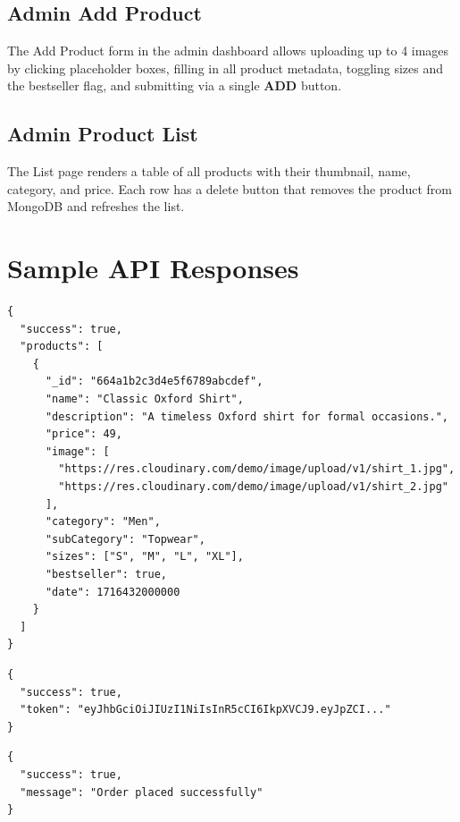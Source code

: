 \documentclass[12pt,a4paper]{report}
\begin{document}
\subsection{Admin Add Product}
The Add Product form in the admin dashboard allows uploading up to 4 images by clicking
placeholder boxes, filling in all product metadata, toggling sizes and the bestseller flag,
and submitting via a single \textbf{ADD} button.

\subsection{Admin Product List}
The List page renders a table of all products with their thumbnail, name, category, and price.
Each row has a delete button that removes the product from MongoDB and refreshes the list.

\section{Sample API Responses}

\begin{lstlisting}[caption={Successful product list response}, label=lst:resp1, language={}]
{
  "success": true,
  "products": [
    {
      "_id": "664a1b2c3d4e5f6789abcdef",
      "name": "Classic Oxford Shirt",
      "description": "A timeless Oxford shirt for formal occasions.",
      "price": 49,
      "image": [
        "https://res.cloudinary.com/demo/image/upload/v1/shirt_1.jpg",
        "https://res.cloudinary.com/demo/image/upload/v1/shirt_2.jpg"
      ],
      "category": "Men",
      "subCategory": "Topwear",
      "sizes": ["S", "M", "L", "XL"],
      "bestseller": true,
      "date": 1716432000000
    }
  ]
}
\end{lstlisting}

\begin{lstlisting}[caption={Successful user login response}, label=lst:resp2, language={}]
{
  "success": true,
  "token": "eyJhbGciOiJIUzI1NiIsInR5cCI6IkpXVCJ9.eyJpZCI..."
}
\end{lstlisting}

\begin{lstlisting}[caption={Successful order placement response}, label=lst:resp3, language={}]
{
  "success": true,
  "message": "Order placed successfully"
}
\end{lstlisting}

\end{document}
